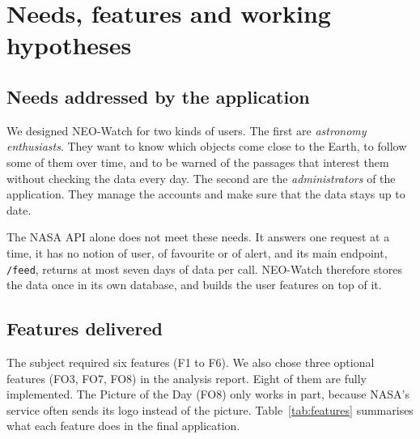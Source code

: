 \section{Needs, features and working hypotheses}
\label{sec:specifications}

\subsection{Needs addressed by the application}

We designed NEO-Watch for two kinds of users. The first are \emph{astronomy enthusiasts}. They
want to know which objects come close to the Earth, to follow some of them over time, and to
be warned of the passages that interest them without checking the data every day. The second
are the \emph{administrators} of the application. They manage the accounts and make sure that
the data stays up to date.

\medskip

The NASA API alone does not meet these needs. It answers one request at a time, it has no
notion of user, of favourite or of alert, and its main endpoint, \texttt{/feed}, returns at most
seven days of data per call. NEO-Watch therefore stores the data once in its own database, and
builds the user features on top of it.

\subsection{Features delivered}

The subject required six features (F1 to F6). We also chose three optional features
(FO3, FO7, FO8) in the analysis report. Eight of them are fully
implemented. The Picture of the Day (FO8) only works in part, because NASA's service often sends
its logo instead of the picture.
Table~\ref{tab:features} summarises what each feature does in the final application.

